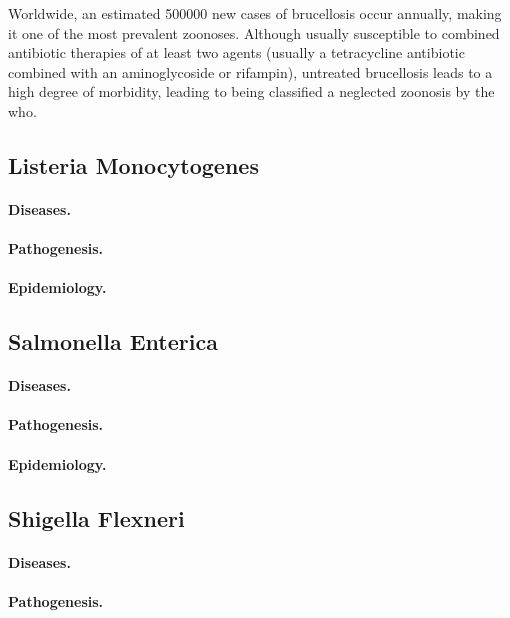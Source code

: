 
Worldwide, an estimated 500000 new cases of brucellosis occur annually, making it one of the most prevalent zoonoses. Although usually susceptible to combined antibiotic therapies of at least two agents (usually a tetracycline antibiotic combined with an aminoglycoside or rifampin), untreated brucellosis leads to a high degree of morbidity, leading to being classified a neglected zoonosis by the \gls{who}.

\subsection{Listeria Monocytogenes}
\paragraph{Diseases.}
\paragraph{Pathogenesis.}
\paragraph{Epidemiology.}

\subsection{Salmonella Enterica}
\paragraph{Diseases.}
\paragraph{Pathogenesis.}
\paragraph{Epidemiology.}

\subsection{Shigella Flexneri}
\paragraph{Diseases.}
\paragraph{Pathogenesis.}
